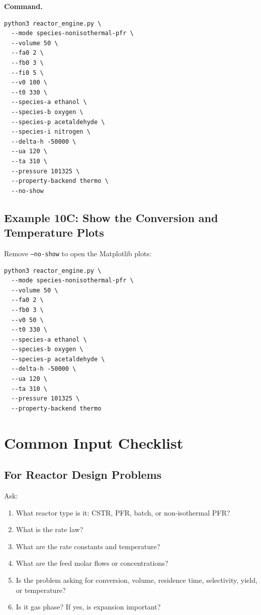 \documentclass[11pt]{article}
\begin{document}
\textbf{Command.}

\begin{lstlisting}
python3 reactor_engine.py \
  --mode species-nonisothermal-pfr \
  --volume 50 \
  --fa0 2 \
  --fb0 3 \
  --fi0 5 \
  --v0 100 \
  --t0 330 \
  --species-a ethanol \
  --species-b oxygen \
  --species-p acetaldehyde \
  --species-i nitrogen \
  --delta-h -50000 \
  --ua 120 \
  --ta 310 \
  --pressure 101325 \
  --property-backend thermo \
  --no-show
\end{lstlisting}

\subsection{Example 10C: Show the Conversion and Temperature Plots}

Remove \texttt{--no-show} to open the Matplotlib plots:

\begin{lstlisting}
python3 reactor_engine.py \
  --mode species-nonisothermal-pfr \
  --volume 50 \
  --fa0 2 \
  --fb0 3 \
  --v0 50 \
  --t0 330 \
  --species-a ethanol \
  --species-b oxygen \
  --species-p acetaldehyde \
  --delta-h -50000 \
  --ua 120 \
  --ta 310 \
  --pressure 101325 \
  --property-backend thermo
\end{lstlisting}

\section{Common Input Checklist}

\subsection{For Reactor Design Problems}

Ask:

\begin{enumerate}
    \item What reactor type is it: CSTR, PFR, batch, or non-isothermal PFR?
    \item What is the rate law?
    \item What are the rate constants and temperature?
    \item What are the feed molar flows or concentrations?
    \item Is the problem asking for conversion, volume, residence time, selectivity, yield, or temperature?
    \item Is it gas phase? If yes, is expansion important?
\end{enumerate}
\end{document}
